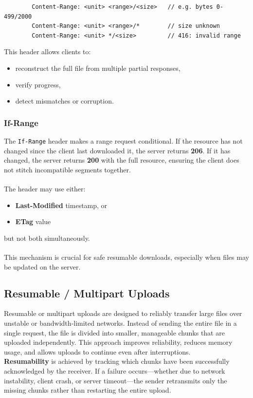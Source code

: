 \documentclass[11pt,a4paper]{article}
\begin{document}
	\begin{lstlisting}
		Content-Range: <unit> <range>/<size>   // e.g. bytes 0-499/2000
		Content-Range: <unit> <range>/*        // size unknown
		Content-Range: <unit> */<size>         // 416: invalid range
	\end{lstlisting}
	This header allows clients to:
	\begin{itemize}
		\item reconstruct the full file from multiple partial responses,
		\item verify progress,
		\item detect mismatches or corruption.
	\end{itemize}
	
	\subsubsection{If-Range}
	The \texttt{If-Range} header makes a range request conditional.  
	If the resource has not changed since the client last downloaded it, the server returns \textbf{206}.  
	If it has changed, the server returns \textbf{200} with the full resource, ensuring the client does not stitch incompatible segments together.
	\\\\
	The header may use either:
	\begin{itemize}
		\item \textbf{Last-Modified} timestamp, or
		\item \textbf{ETag} value
	\end{itemize}
	but not both simultaneously.\\\\
	This mechanism is crucial for safe resumable downloads, especially when files may be updated on the server.
	
	
	
	\label{sec:background}
	\subsection{Resumable / Multipart Uploads}
	Resumable or multipart uploads are designed to reliably transfer large files over unstable or bandwidth‑limited networks. Instead of sending the entire file in a single request, the file is divided into smaller, manageable chunks that are uploaded independently. This approach improves reliability, reduces memory usage, and allows uploads to continue even after interruptions.
	\\
	\textbf{Resumability} is achieved by tracking which chunks have been successfully acknowledged by the receiver.  
	If a failure occurs—whether due to network instability, client crash, or server timeout—the sender retransmits only the missing chunks rather than restarting the entire upload.
	
\end{document}
